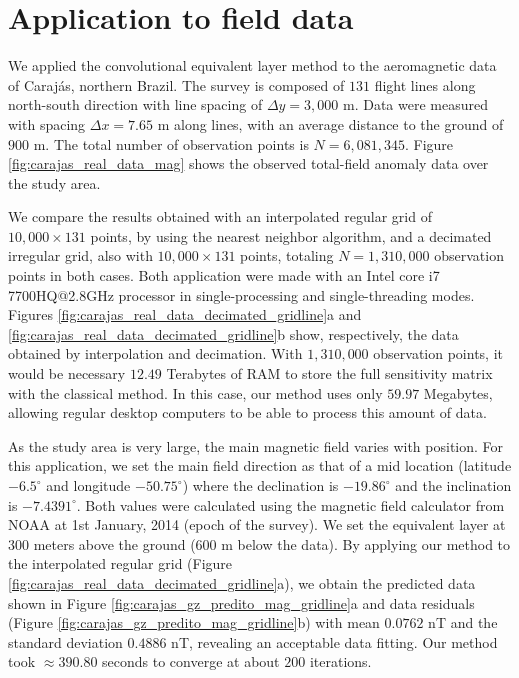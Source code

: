 \documentclass[manuscript]{geophysics}
\begin{document}
	\section{Application to field data}
	
	We applied the convolutional equivalent layer method to the aeromagnetic data of Carajás, 
	northern Brazil.
	The survey is composed of $131$ flight lines along north-south direction with line spacing of 
	$\Delta y = 3,000$ m. 
	Data were measured with spacing $\Delta x = 7.65$ m along lines, with an average distance 
	to the ground of $900$ m.%
	The total number of observation points is $N = 6,081,345$. Figure \ref{fig:carajas_real_data_mag} 
	shows the observed total-field anomaly data over the study area.
	
	We compare the results obtained with an interpolated regular grid of $10,000 \times 131$ points, 
	by using the nearest neighbor algorithm, and a decimated irregular grid, also with $10,000 \times 131$
	points, totaling $N = 1,310,000$ observation points in both cases. 
	Both application were made with an Intel core i7 7700HQ@2.8GHz processor in single-processing and 
	single-threading modes. 
	Figures \ref{fig:carajas_real_data_decimated_gridline}a and 
	\ref{fig:carajas_real_data_decimated_gridline}b show, respectively, the data obtained by interpolation
	and decimation. 
	With $1,310,000$ observation points, it would be necessary $12.49$ Terabytes of RAM to store the full
	sensitivity matrix with the classical method. 
	In this case, our method uses only $59.97$ Megabytes, allowing regular desktop computers to be able 
	to process this amount of data.
	
	As the study area is very large, the main magnetic field varies with position.
	For this application, we set the main field direction as that of a mid location 
	(latitude $-6.5^{\circ}$ and longitude $-50.75^{\circ}$) where the declination is $-19.86^{\circ}$ and
	the inclination is $-7.4391^{\circ}$. Both values were calculated using the magnetic field calculator from NOAA
	at 1st January, 2014 (epoch of the survey).
	We set the equivalent layer at $300$ meters above the ground ($600$ m below the data).
	By applying our method to the interpolated regular grid 
	(Figure \ref{fig:carajas_real_data_decimated_gridline}a), we obtain the  predicted data shown in 
	Figure \ref{fig:carajas_gz_predito_mag_gridline}a and data residuals 
	(Figure \ref{fig:carajas_gz_predito_mag_gridline}b) with mean $0.0762$ nT and the standard deviation 
	$0.4886$ nT, revealing an acceptable data fitting.
	Our method took $\approx 390.80$ seconds to converge at about $200$ iterations.
	
\end{document}
